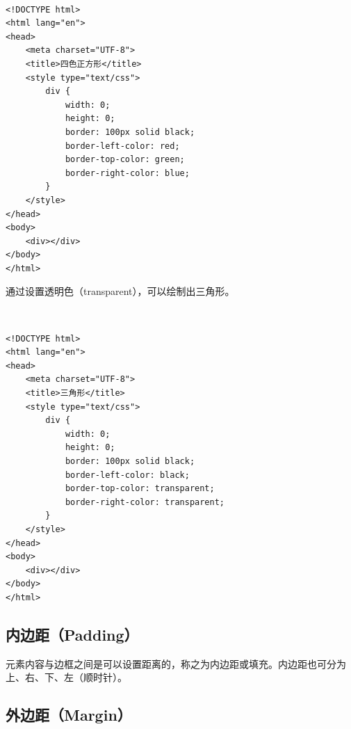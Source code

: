 \\

\begin{lstlisting}[style=htmlcssjs]
<!DOCTYPE html>
<html lang="en">
<head>
    <meta charset="UTF-8">
    <title>四色正方形</title>
    <style type="text/css">
        div {
            width: 0;
            height: 0;
            border: 100px solid black;
            border-left-color: red;
            border-top-color: green;
            border-right-color: blue;
        }
    </style>
</head>
<body>
    <div></div>
</body>
</html>
\end{lstlisting}

通过设置透明色（transparent），可以绘制出三角形。

\begin{figure}[H]
	\centering
\end{figure}

\\

\begin{lstlisting}[style=htmlcssjs]
<!DOCTYPE html>
<html lang="en">
<head>
    <meta charset="UTF-8">
    <title>三角形</title>
    <style type="text/css">
        div {
            width: 0;
            height: 0;
            border: 100px solid black;
            border-left-color: black;
            border-top-color: transparent;
            border-right-color: transparent;
        }
    </style>
</head>
<body>
    <div></div>
</body>
</html>
\end{lstlisting}

\vspace{0.5cm}

\subsection{内边距（Padding）}

元素内容与边框之间是可以设置距离的，称之为内边距或填充。内边距也可分为上、右、下、左（顺时针）。\\

\subsection{外边距（Margin）}

